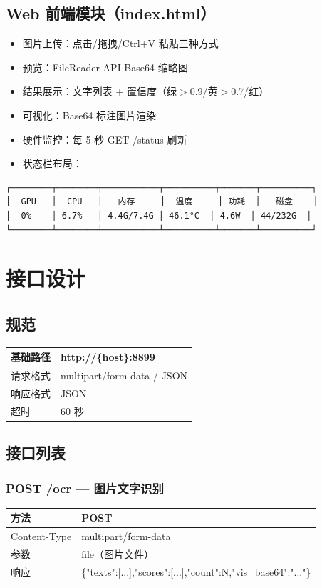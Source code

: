 \documentclass[12pt,a4paper]{ctexart}
\begin{document}
\subsection{Web 前端模块（index.html）}
\begin{itemize}
    \item 图片上传：点击/拖拽/Ctrl+V 粘贴三种方式
    \item 预览：FileReader API Base64 缩略图
    \item 结果展示：文字列表 + 置信度（绿$>$0.9/黄$>$0.7/红）
    \item 可视化：Base64 标注图片渲染
    \item 硬件监控：每 5 秒 GET /status 刷新
    \item 状态栏布局：
\end{itemize}
\begin{lstlisting}[caption={前端状态栏}]
┌────────┬────────┬───────────┬──────────┬───────┬──────────┐
│  GPU   │  CPU   │   内存     │  温度     │ 功耗  │   磁盘    │
│  0%    │ 6.7%   │ 4.4G/7.4G │ 46.1°C  │ 4.6W  │ 44/232G  │
└────────┴────────┴───────────┴──────────┴───────┴──────────┘
\end{lstlisting}

\section{接口设计}

\subsection{规范}
\begin{longtable}{|p{3cm}|p{10cm}|}\hline
基础路径 & http://\{host\}:8899 \\\hline
请求格式 & multipart/form-data / JSON \\\hline
响应格式 & JSON \\\hline
超时 & 60 秒 \\\hline
\end{longtable}

\subsection{接口列表}

\subsubsection{POST /ocr — 图片文字识别}
\begin{longtable}{|p{3cm}|p{10cm}|}\hline
方法 & POST \\\hline
Content-Type & multipart/form-data \\\hline
参数 & file（图片文件） \\\hline
响应 & \{"texts":[...],"scores":[...],"count":N,"vis\_base64":"..."\} \\\hline
\end{longtable}
\end{document}
